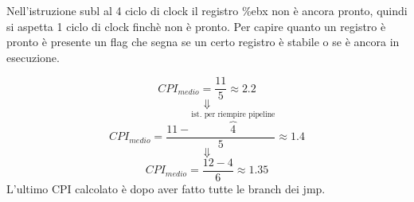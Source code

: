 \documentclass[a4paper]{article}
\theoremstyle{break}
\theoremstyle{break}
\theoremstyle{break}
\theoremstyle{break}
\begin{document}
\begin{table}[H]
  \centering
\end{table}

\noindent Nell'istruzione subl al 4 ciclo di clock il registro \%ebx non è
ancora pronto, quindi si aspetta 1 ciclo di clock finchè non è pronto. Per
capire quanto un registro è pronto è presente un flag che segna se un certo
registro è stabile o se è ancora in esecuzione.

\[
  CPI_{medio} = \frac{11}{5} \approx 2.2
\] 
\[
\Downarrow
\] 
\[
  CPI_{medio} = \frac{11 - \overbrace{4}^{\text{ist. per riempire pipeline}}}{5} \approx 1.4
\] 
\[
\Downarrow
\] 
\[
  CPI_{medio} = \frac{12-4}{6} \approx 1.35
\] 
L'ultimo CPI calcolato è dopo aver fatto tutte le branch dei jmp.
\end{document}
